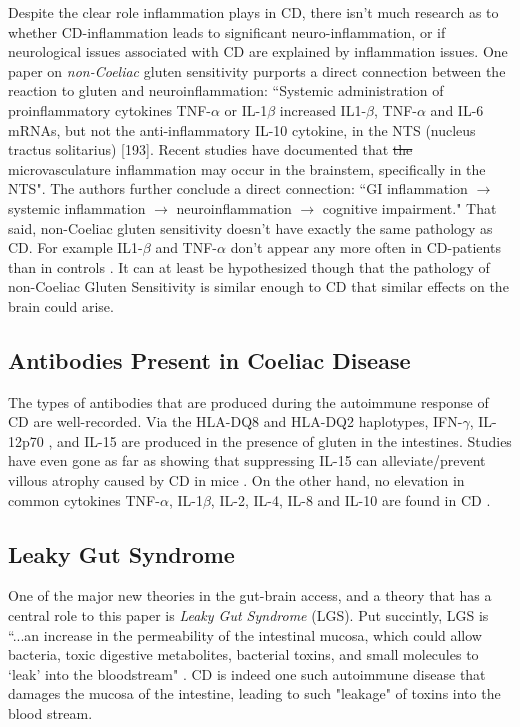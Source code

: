 \documentclass{article}
\begin{document}
Despite the clear role inflammation plays in CD, there isn't much research as to whether CD-inflammation leads to significant neuro-inflammation, or if neurological issues associated with CD are explained by inflammation issues. One paper on \textit{non-Coeliac} gluten sensitivity purports a direct connection between the reaction to gluten and neuroinflammation: ``Systemic administration of proinflammatory cytokines TNF-$\alpha$ or IL-1$\beta$ increased IL1-$\beta$, TNF-$\alpha$ and IL-6 mRNAs, but not the anti-inflammatory IL-10 cytokine, in the NTS (nucleus tractus solitarius) [193]. Recent studies have documented that \st{the
} microvasculature inflammation may occur in the brainstem, specifically in the NTS"\cite{Daulatzai}. The authors further conclude a direct connection: ``GI inflammation $\rightarrow$ systemic inflammation $\rightarrow$ neuroinflammation $\rightarrow$ cognitive impairment." That said, non-Coeliac gluten sensitivity doesn't have exactly the same pathology as CD. For example IL1-$\beta$ and TNF-$\alpha$ don't appear any more often in CD-patients than in controls \cite{Bjork}. It can at least be hypothesized though that the pathology of non-Coeliac Gluten Sensitivity is similar enough to CD that similar effects on the brain could arise. 

\subsection{Antibodies Present in Coeliac Disease}

The types of antibodies that are produced during the autoimmune response of CD are well-recorded. Via the HLA-DQ8 and HLA-DQ2 haplotypes, IFN-$\gamma$, IL-12p70 \cite{Bjork,DePaolo}, and IL-15 \cite{DePaolo} \cite{Yokoyama} \cite{Abadie} are produced in the presence of gluten in the intestines. Studies have even gone as far as showing that suppressing IL-15 can alleviate/prevent villous atrophy caused by CD in mice \cite{DePaolo} \cite{Yokoyama}. On the other hand, no elevation in common cytokines TNF-$\alpha$, IL-1$\beta$, IL-2, IL-4, IL-8 and IL-10 are found in CD \cite{Bjork,Aflatoonian}. 

\subsection{Leaky Gut Syndrome}

One of the major new theories in the gut-brain access, and a theory that has a central role to this paper is \textit{Leaky Gut Syndrome} (LGS). Put succintly, LGS is ``...an increase in the permeability of the intestinal mucosa, which could allow bacteria, toxic digestive metabolites, bacterial toxins, and small molecules to ‘leak’ into the bloodstream" \cite{Obrenovich}. CD is indeed one such autoimmune disease that damages the mucosa of the intestine, leading to such "leakage" of toxins into the blood stream. 
\end{document}
